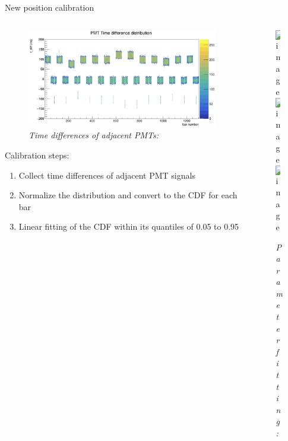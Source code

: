 \documentclass{ikpKoeln}
\begin{document}
\begin{frame}[t]{New position calibration}
	\vspace {-2em}
	\begin{columns}[t]
		\begin{column}{0.45 \textwidth}
			\begin{figure}
				\captionsetup{singlelinecheck=off,font=footnotesize}
				\caption*{\textit{Time differences of adjacent PMTs:}}
				\vspace{-0.5em}
				\includegraphics[width = \textwidth]{R3BCon2024GSI/total_tdiff.png}
			\end{figure}
			\vspace{-1em}
			\begin{block}{Calibration steps:}
				\begin{enumerate}
					\setlength\itemsep{0em}
					\small
					\item<1-> Collect time differences of adjacent PMT signals
					\item<2-> Normalize the distribution and convert to the CDF for each bar
					\item<3-> Linear fitting of the CDF within its quantiles of 0.05 to 0.95
				\end{enumerate}
			\end{block}
		\end{column}
		\begin{column}{0.45 \textwidth}
			\begin{figure}
				\captionsetup{singlelinecheck=off,font=footnotesize}
				\caption*{\textit{Parameter fitting:}}
				\vspace*{-0.5em}
				\includegraphics<1>[width = 0.9\textwidth]{neuland/position_cal/TimeDifference2.png}
				\includegraphics<2>[width = 0.9\textwidth]{neuland/position_cal/TimeDifference3.png}
				\includegraphics<3>[width = 0.9\textwidth]{neuland/position_cal/TimeDifference4.png}
			\end{figure}

\end{column}
\end{columns}
\end{frame}
\end{document}
